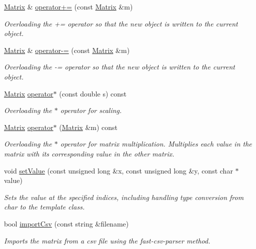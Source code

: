 \begin{DoxyCompactItemize}
\hyperlink{class_matrix}{Matrix} \& \hyperlink{class_matrix_a480a72298ae1fc8443b0edfaa66d7c46}{operator+=} (const \hyperlink{class_matrix}{Matrix} \&m)
\begin{DoxyCompactList}\small\item\em Overloading the += operator so that the new object is written to the current object. \end{DoxyCompactList}\item 
\hyperlink{class_matrix}{Matrix} \& \hyperlink{class_matrix_a0e459fd035b2435ea016dc93c55ccac0}{operator-\/=} (const \hyperlink{class_matrix}{Matrix} \&m)
\begin{DoxyCompactList}\small\item\em Overloading the -\/= operator so that the new object is written to the current object. \end{DoxyCompactList}\item 
\hyperlink{class_matrix}{Matrix} \hyperlink{class_matrix_a7285ecf2cfdfdcf3a3e19b4cde235528}{operator$\ast$} (const double s) const 
\begin{DoxyCompactList}\small\item\em Overloading the $\ast$ operator for scaling. \end{DoxyCompactList}\item 
\hyperlink{class_matrix}{Matrix} \hyperlink{class_matrix_a965f8987b92cfdbf8f17d3cf1bf0fa9b}{operator$\ast$} (\hyperlink{class_matrix}{Matrix} \&m) const 
\begin{DoxyCompactList}\small\item\em Overloading the $\ast$ operator for matrix multiplication. Multiplies each value in the matrix with its corresponding value in the other matrix. \end{DoxyCompactList}\item 
void \hyperlink{class_matrix_ae511e2f5874e7602fc968541efeefca1}{set\+Value} (const unsigned long \&x, const unsigned long \&y, const char $\ast$value)
\begin{DoxyCompactList}\small\item\em Sets the value at the specified indices, including handling type conversion from char to the template class. \end{DoxyCompactList}\item 
bool \hyperlink{class_matrix_a0a5d9135e9807b81ddc3cf05e777a902}{import\+Csv} (const string \&filename)
\begin{DoxyCompactList}\small\item\em Imports the matrix from a csv file using the fast-\/csv-\/parser method. \end{DoxyCompactList}\end{DoxyCompactItemize}
